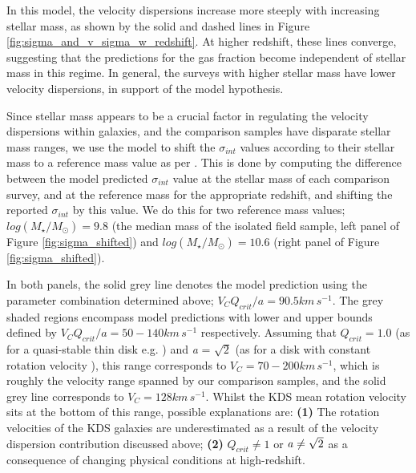 \documentclass[fleqn,usenatbib]{mnras}
\begin{document}
In this model, the velocity dispersions increase more steeply with increasing stellar mass, as shown by the solid and dashed lines in Figure \ref{fig:sigma_and_v_sigma_w_redshift}.
At higher redshift, these lines converge, suggesting that the predictions for the gas fraction become independent of stellar mass in this regime.
In general, the surveys with higher stellar mass have lower velocity dispersions, in support of the model hypothesis.

Since stellar mass appears to be a crucial factor in regulating the velocity dispersions within galaxies, and the comparison samples have disparate stellar mass ranges, we use the model to shift the $\sigma_{int}$ values according to their stellar mass to a reference mass value as per \cite{Wisnioski2015}.
This is done by computing the difference between the model predicted $\sigma_{int}$ value at the stellar mass of each comparison survey, and at the reference mass for the appropriate redshift, and shifting the reported $\sigma_{int}$ by this value.
We do this for two reference mass values; $log(M_{\star}/M_{\odot}) = 9.8$ (the median mass of the isolated field sample, left panel of Figure \ref{fig:sigma_shifted}) and $log(M_{\star}/M_{\odot}) = 10.6$ (right panel of Figure \ref{fig:sigma_shifted}).

In both panels, the solid grey line denotes the model prediction using the parameter combination determined above; $V_{C}Q_{crit}/a = 90.5km\,s^{-1}$.
The grey shaded regions encompass model predictions with lower and upper bounds defined by $V_{C}Q_{crit}/a = 50-140km\,s^{-1}$ respectively.
Assuming that $Q_{crit} = 1.0$ (as for a quasi-stable thin disk e.g. \citealt{ForsterSchreiber2006,Burkert2010}) and {\it a} = $\sqrt{2}$ (as for a disk with constant rotation velocity \citealt{Wisnioski2015}), this range corresponds to $V_{C} = 70-200km\,s^{-1}$, which is roughly the velocity range spanned by our comparison samples, and the solid grey line corresponds to $V_{C} = 128km\,s^{-1}$.
Whilst the KDS mean rotation velocity sits at the bottom of this range, possible explanations are: \textbf{(1)} The rotation velocities of the KDS galaxies are underestimated as a result of the velocity dispersion contribution discussed above; \textbf{(2)} $Q_{crit} \ne 1$ or ${\it a} \ne \sqrt{2}$ as a consequence of changing physical conditions at high-redshift. \\
\end{document}
